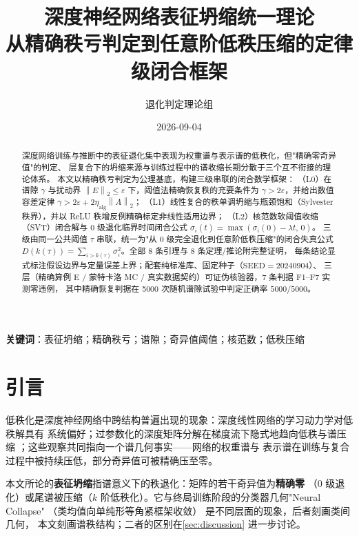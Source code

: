 \documentclass[UTF8,11pt,a4paper]{ctexart}
\title{\textbf{深度神经网络表征坍缩统一理论}\\[3pt]
\large 从精确秩亏判定到任意阶低秩压缩的定律级闭合框架}
\author{退化判定理论组}
\date{2026-09-04}
\theoremstyle{plain}
\theoremstyle{definition}
\theoremstyle{remark}
\newcommand{\Tnorm}[1]{\left\lVert #1\right\rVert_2}
\begin{document}
\maketitle

\begin{abstract}
\noindent
深度网络训练与推断中的表征退化集中表现为权重谱与表示谱的低秩化，但"精确零奇异值"的判定、
层复合下的坍缩来源与训练过程中的谱收缩长期分散于三个互不衔接的理论体系。
本文以精确秩亏判定为公理基底，构建三级串联的闭合数学框架：
（L0）在谱隙 $\gamma$ 与扰动界 $\Tnorm{E}\le\varepsilon$ 下，阈值法精确恢复秩的充要条件为
$\gamma>2\varepsilon$，并给出数值容差定律 $\gamma>2\varepsilon+2\eta_{\mathrm{alg}}\Tnorm{A}$；
（L1）线性复合的秩单调坍缩与瓶颈饱和（Sylvester 秩界），并以 ReLU 秩增反例精确标定非线性适用边界；
（L2）核范数软阈值收缩（SVT）闭合解与 0 级退化临界时间闭合公式
$\sigma_i(t)=\max(\sigma_i(0)-\lambda t,\,0)$。
三级由同一公共阈值 $\tau$ 串联，统一为"从 0 级完全退化到任意阶低秩压缩"的闭合失真公式
$D(k(\tau))=\sum_{i>k(\tau)}\sigma_i^2$。全部 8 条引理与 8 条定理/推论附完整证明，
每条结论显式标注假设边界与定量误差上界；配套纯标准库、固定种子（$\mathrm{SEED}=20240904$）、
三层（精确算例 E / 蒙特卡洛 MC / 真实数据契约）可证伪核验器，7 条判据 F1--F7 实测零违例，
其中精确恢复判据在 5000 次随机谱隙试验中判定正确率 $5000/5000$。
\end{abstract}

\noindent\textbf{关键词}：表征坍缩；精确秩亏；谱隙；奇异值阈值；核范数；低秩压缩

\section{引言}\label{sec:intro}

低秩化是深度神经网络中跨结构普遍出现的现象\cite{goodfellow2016}：深度线性网络的学习动力学对低秩解具有
系统偏好\cite{saxe2014}；过参数化的深度矩阵分解在梯度流下隐式地趋向低秩与谱压缩
\cite{arora2018,li2018,arora2019}；这些观察共同指向一个谱几何事实——网络的权重谱与
表示谱在训练与复合过程中被持续压低，部分奇异值可被精确压至零。

本文所论的\textbf{表征坍缩}指谱意义下的秩退化：矩阵的若干奇异值为\textbf{精确零}
（0 级退化）或尾谱被压缩（$k$ 阶低秩化）。它与终局训练阶段的分类器几何"Neural Collapse"
（类均值向单纯形等角紧框架收敛）\cite{papyan2020} 是不同层面的现象，后者刻画类间几何，
本文刻画谱秩结构；二者的区别在\textsection\ref{sec:discussion} 进一步讨论。
\end{document}
